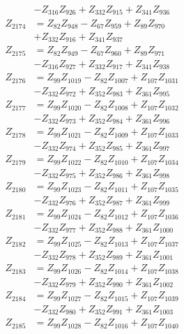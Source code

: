 \begin{multicols}{2}
\begin{align}
&- Z_{316}Z_{926} + Z_{332}Z_{915} + Z_{341}Z_{936} \nonumber \\
Z_{2174} &= Z_{82}Z_{948} - Z_{67}Z_{959} + Z_{89}Z_{970}  \nonumber \\
&+ Z_{332}Z_{916} + Z_{341}Z_{937} \nonumber \\
Z_{2175} &= Z_{82}Z_{949} - Z_{67}Z_{960} + Z_{89}Z_{971}  \nonumber \\
&- Z_{316}Z_{927} + Z_{332}Z_{917} + Z_{341}Z_{938} \nonumber \\
Z_{2176} &= Z_{99}Z_{1019} - Z_{82}Z_{1007} + Z_{107}Z_{1031}  \nonumber \\
&- Z_{332}Z_{972} + Z_{352}Z_{983} + Z_{361}Z_{995} \nonumber \\
Z_{2177} &= Z_{99}Z_{1020} - Z_{82}Z_{1008} + Z_{107}Z_{1032}  \nonumber \\
&- Z_{332}Z_{973} + Z_{352}Z_{984} + Z_{361}Z_{996} \nonumber \\
Z_{2178} &= Z_{99}Z_{1021} - Z_{82}Z_{1009} + Z_{107}Z_{1033}  \nonumber \\
&- Z_{332}Z_{974} + Z_{352}Z_{985} + Z_{361}Z_{997} \nonumber \\
Z_{2179} &= Z_{99}Z_{1022} - Z_{82}Z_{1010} + Z_{107}Z_{1034}  \nonumber \\
&- Z_{332}Z_{975} + Z_{352}Z_{986} + Z_{361}Z_{998} \nonumber \\
Z_{2180} &= Z_{99}Z_{1023} - Z_{82}Z_{1011} + Z_{107}Z_{1035}  \nonumber \\
&- Z_{332}Z_{976} + Z_{352}Z_{987} + Z_{361}Z_{999} \nonumber \\
Z_{2181} &= Z_{99}Z_{1024} - Z_{82}Z_{1012} + Z_{107}Z_{1036}  \nonumber \\
&- Z_{332}Z_{977} + Z_{352}Z_{988} + Z_{361}Z_{1000} \nonumber \\
Z_{2182} &= Z_{99}Z_{1025} - Z_{82}Z_{1013} + Z_{107}Z_{1037}  \nonumber \\
&- Z_{332}Z_{978} + Z_{352}Z_{989} + Z_{361}Z_{1001} \nonumber \\
Z_{2183} &= Z_{99}Z_{1026} - Z_{82}Z_{1014} + Z_{107}Z_{1038}  \nonumber \\
&- Z_{332}Z_{979} + Z_{352}Z_{990} + Z_{361}Z_{1002} \nonumber \\
Z_{2184} &= Z_{99}Z_{1027} - Z_{82}Z_{1015} + Z_{107}Z_{1039}  \nonumber \\
&- Z_{332}Z_{980} + Z_{352}Z_{991} + Z_{361}Z_{1003} \nonumber \\
Z_{2185} &= Z_{99}Z_{1028} - Z_{82}Z_{1016} + Z_{107}Z_{1040}  \nonumber \\

\end{align}
\end{multicols}
